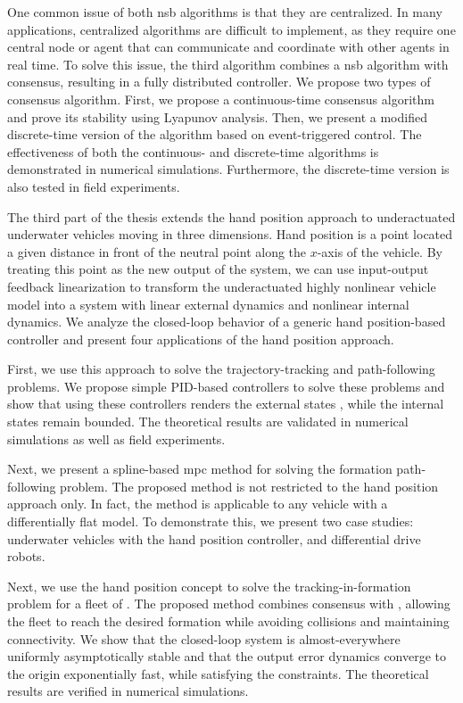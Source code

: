 One common issue of both \acrlong{nsb} algorithms is that they are centralized.
In many applications, centralized algorithms are difficult to implement, as they require one central node or agent that can communicate and coordinate with other agents in real time.
To solve this issue, the third algorithm combines a \acrlong{nsb} algorithm with consensus, resulting in a fully distributed controller.
We propose two types of consensus algorithm.
First, we propose a continuous-time consensus algorithm and prove its stability using Lyapunov analysis.
Then, we present a modified discrete-time version of the algorithm based on event-triggered control.
The effectiveness of both the continuous- and discrete-time algorithms is demonstrated in numerical simulations.
Furthermore, the discrete-time version is also tested in field experiments.

The third part of the thesis extends the hand position approach to underactuated underwater vehicles moving in three dimensions.
Hand position is a point located a given distance in front of the neutral point along the $x$-axis of the vehicle.
By treating this point as the new output of the system, we can use input-output feedback linearization to transform the underactuated highly nonlinear vehicle model into a system with linear external dynamics and nonlinear internal dynamics.
We analyze the closed-loop behavior of a generic hand position-based controller and present four applications of the hand position approach.

First, we use this approach to solve the trajectory-tracking and path-following problems.
We propose simple PID-based controllers to solve these problems and show that using these controllers renders the external states , while the internal states remain bounded.
The theoretical results are validated in numerical simulations as well as field experiments.

Next, we present a spline-based \acrlong{mpc} method for solving the formation path-following problem.
The proposed method is not restricted to the hand position approach only.
In fact, the method is applicable to any vehicle with a differentially flat model.
To demonstrate this, we present two case studies: underwater vehicles with the hand position controller, and differential drive robots.

Next, we use the hand position concept to solve the tracking-in-formation problem for a fleet of .
The proposed method combines consensus with , allowing the fleet to reach the desired formation while avoiding collisions and maintaining connectivity.
We show that the closed-loop system is almost-everywhere uniformly asymptotically stable and that the output error dynamics converge to the origin exponentially fast, while satisfying the constraints.
The theoretical results are verified in numerical simulations.

